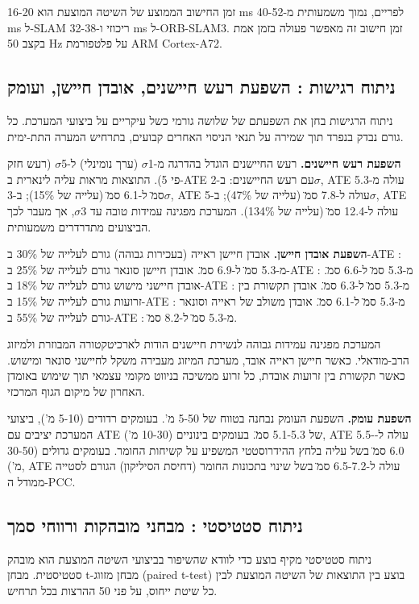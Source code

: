 זמן החישוב הממוצע של השיטה המוצעת הוא 16-20 ms לפריים, נמוך משמעותית מ-40-52 ms ל-SLAM ריכוזי ו-32-38 ms ל-ORB-SLAM3. זמן חישוב זה מאפשר פעולה בזמן אמת בקצב 50 Hz על פלטפורמת ARM Cortex-A72.

\subsection{ניתוח רגישות : השפעת רעש חיישנים, אובדן חיישן, ועומק}
\label{sec:ch08_sensitivity}

ניתוח הרגישות בחן את השפעתם של שלושה גורמי כשל עיקריים על ביצועי המערכת. כל גורם נבדק בנפרד תוך שמירה על תנאי הניסוי האחרים קבועים, בתרחיש המערה התת-ימית.

\textbf{השפעת רעש חיישנים.} רעש החיישנים הוגדל בהדרגה מ-1$\sigma$ (ערך נומינלי) ל-5$\sigma$ (רעש חזק פי 5). התוצאות מראות עליה לינארית ב-ATE עם רעש החיישנים: ב-2$\sigma$, ATE עולה מ-5.3 ס\"מ ל-6.1 ס\"מ (עלייה של 15\%); ב-3$\sigma$, ATE עולה ל-7.8 ס\"מ (עלייה של 47\%); ב-5$\sigma$, ATE עולה ל-12.4 ס\"מ (עלייה של 134\%). המערכת מפגינה עמידות טובה עד 3$\sigma$, אך מעבר לכך הביצועים מתדרדרים משמעותית.

\textbf{השפעת אובדן חיישן.} אובדן חיישן ראייה (בעכירות גבוהה) גורם לעלייה של 30\% ב-ATE : מ-5.3 ס\"מ ל-6.9 ס\"מ. אובדן חיישן סונאר גורם לעלייה של 25\% ב-ATE : מ-5.3 ס\"מ ל-6.6 ס\"מ. אובדן חיישני מישוש גורם לעלייה של 18\% ב-ATE : מ-5.3 ס\"מ ל-6.3 ס\"מ. אובדן תקשורת בין זרועות גורם לעלייה של 15\% ב-ATE : מ-5.3 ס\"מ ל-6.1 ס\"מ. אובדן משולב של ראייה וסונאר גורם לעלייה של 55\% ב-ATE : מ-5.3 ס\"מ ל-8.2 ס\"מ.

המערכת מפגינה עמידות גבוהה לנשירת חיישנים הודות לארכיטקטורה המבוזרת ולמיזוג הרב-מודאלי. כאשר חיישן ראייה אובד, מערכת המיזוג מעבירה משקל לחיישני סונאר ומישוש. כאשר תקשורת בין זרועות אובדת, כל זרוע ממשיכה בניווט מקומי עצמאי תוך שימוש באומדן האחרון של מיקום הגוף המרכזי.

\textbf{השפעת עומק.} השפעת העומק נבחנה בטווח של 5-50 מ'. בעומקים רדודים (5-10 מ'), ביצועי המערכת יציבים עם ATE של 5.1-5.3 ס\"מ. בעומקים בינוניים (10-30 מ'), ATE עולה ל-5.5-6.0 ס\"מ בשל עליה בלחץ ההידרוסטטי המשפיע על קשיחות החומר. בעומקים גדולים (30-50 מ'), ATE עולה ל-6.5-7.2 ס\"מ בשל שינוי בתכונות החומר (דחיסת הסיליקון) הגורם לסטייה ממודל ה-PCC.

\subsection{ניתוח סטטיסטי : מבחני מובהקות ורווחי סמך}
\label{sec:ch08_statistical}

ניתוח סטטיסטי מקיף בוצע כדי לוודא שהשיפור בביצועי השיטה המוצעת הוא מובהק סטטיסטית. מבחן t-מבחן מזווג (paired t-test) בוצע בין התוצאות של השיטה המוצעת לבין כל שיטת ייחוס, על פני 50 ההרצות בכל תרחיש.

